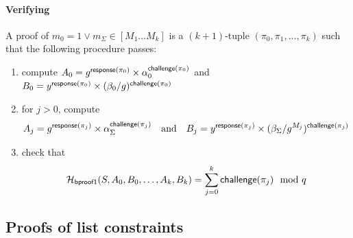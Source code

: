 \documentclass[a4paper]{article}
\begin{document}
\paragraph{Verifying \oproof}
A proof of $m_0=1\lor m_\Sigma\in[M_1\dots M_k]$ is a $(k+1)$-tuple
$(\pi_0,\pi_1,\dotsc,\pi_k)$ such that the following procedure passes:
\begin{enumerate}
\item compute
  $A_0=g^{\textsf{response}(\pi_0)}\times\alpha_0^{\textsf{challenge}(\pi_0)}$
  and
  $B_0=y^{\textsf{response}(\pi_0)}\times(\beta_0/g)^{\textsf{challenge}(\pi_0)}$
\item for $j>0$, compute
  \[A_j=g^{\textsf{response}(\pi_j)}\times\alpha_\Sigma^{\textsf{challenge}(\pi_j)}
  \quad\text{and}\quad
  B_j=y^{\textsf{response}(\pi_j)}\times(\beta_\Sigma/g^{M_j})^{\textsf{challenge}(\pi_j)}\]
\item check that
  \[\mathcal{H}_{\textsf{bproof1}}(S,A_0,B_0,\dots,A_k,B_k)=\sum_{j=0}^k\textsf{challenge}(\pi_j)\mod q\]
\end{enumerate}

\subsection{Proofs of list constraints}
\label{list-proofs}
\end{document}
